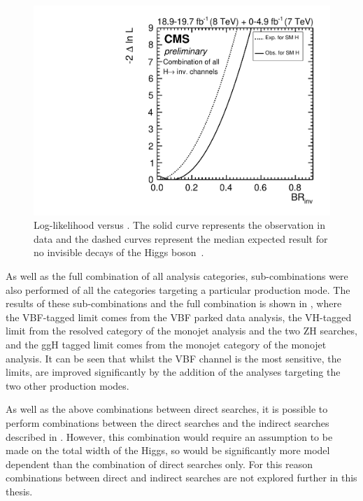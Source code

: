 \begin{figure}
  \includegraphics[width=\largefigwidth]{plots/comb/HIG-15-012-figs/combscan.pdf}
  \caption[Log-likelihood versus \BRinv. The solid curve represents the observation in data and the dashed curves represent the median expected result for no invisible decays of the Higgs boson.]{Log-likelihood versus \BRinv. The solid curve represents the observation in data and the dashed curves represent the median expected result for no invisible decays of the Higgs boson~\cite{CMS-PAS-HIG-15-012}.}
  \label{fig:parkedcombscan}
\end{figure}

As well as the full combination of all analysis categories, sub-combinations were also performed of all the categories targeting a particular production mode. The results of these sub-combinations and the full combination is shown in , where the \ac{VBF}-tagged limit comes from the \ac{VBF} parked data analysis, the \ac{VH}-tagged limit from the resolved category of the monojet analysis and the two ZH searches, and the \ac{ggH} tagged limit comes from the monojet category of the monojet analysis. It can be seen that whilst the \ac{VBF} channel is the most sensitive, the limits, are improved significantly by the addition of the analyses targeting the two other production modes.

As well as the above combinations between direct searches, it is possible to perform combinations between the direct searches and the indirect searches described in . However, this combination would require an assumption to be made on the total width of the Higgs, so would be significantly more model dependent than the combination of direct searches only. For this reason combinations between direct and indirect searches are not explored further in this thesis.

